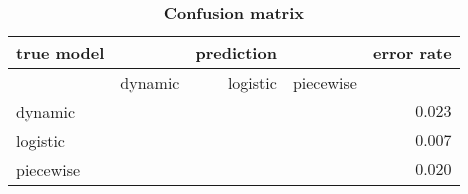 \documentclass[a4paper]{article}
\begin{document}
\begin{table}[tbh]
\caption{\textbf{Confusion matrix}}
\label{tab:confusion_matrix}
\small
\begin{tabular}{lrrrr}
\hline
true model &         & prediction &           & error rate \\
\hline\hline
           & dynamic & logistic   & piecewise &  \\
\hline
dynamic    &    \cellcolor{pciblue!92.640!white!100}{$92640$} &        \cellcolor{pciblue!0.768!white!100}{$768$} &      \cellcolor{pciblue!1.388!white!100}{$1388$} &      $0.023$ \\
logistic   &      \cellcolor{pciblue!0.044!white!100}{$44$} &      \cellcolor{pciblue!99.292!white!100}{$99292$} &       \cellcolor{pciblue!0.664!white!100}{$664$} &      $0.007$ \\
piecewise  &     \cellcolor{pciblue!0.545!white!100}{$545$} &       \cellcolor{pciblue!1.423!white!100}{$1423$} &     \cellcolor{pciblue!98.032!white!100}{$98032$} &      $0.020$ \\
\hline%
\end{tabular}
\end{table}
\end{document}
